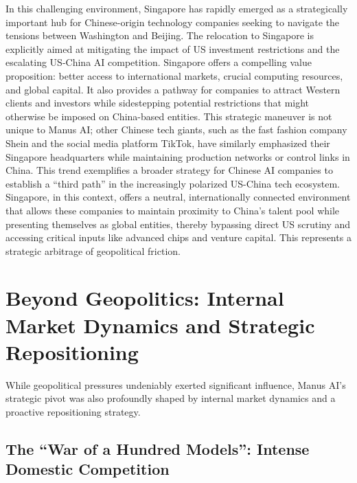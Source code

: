 In this challenging environment, Singapore has rapidly emerged as a strategically important hub for Chinese-origin technology companies seeking to navigate the tensions between Washington and Beijing.
The relocation to Singapore is explicitly aimed at mitigating the impact of US investment restrictions and the escalating US-China AI competition.
Singapore offers a compelling value proposition: better access to international markets, crucial computing resources, and global capital.
It also provides a pathway for companies to attract Western clients and investors while sidestepping potential restrictions that might otherwise be imposed on China-based entities.
This strategic maneuver is not unique to Manus AI; other Chinese tech giants, such as the fast fashion company Shein and the social media platform TikTok, have similarly emphasized their Singapore headquarters while maintaining production networks or control links in China.
This trend exemplifies a broader strategy for Chinese AI companies to establish a ``third path'' in the increasingly polarized US-China tech ecosystem.
Singapore, in this context, offers a neutral, internationally connected environment that allows these companies to maintain proximity to China's talent pool while presenting themselves as global entities, thereby bypassing direct US scrutiny and accessing critical inputs like advanced chips and venture capital.
This represents a strategic arbitrage of geopolitical friction.

\section{Beyond Geopolitics: Internal Market Dynamics and Strategic Repositioning}

While geopolitical pressures undeniably exerted significant influence, Manus AI's strategic pivot was also profoundly shaped by internal market dynamics and a proactive repositioning strategy.

\subsection{The ``War of a Hundred Models'': Intense Domestic Competition}

